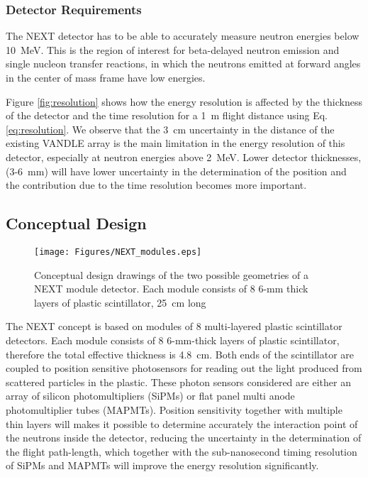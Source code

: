 \documentclass[preprint,3p,twocolumn]{elsarticle}
\begin{document}
\subsubsection{Detector Requirements}
The NEXT detector has to be able to accurately measure neutron energies below 10~MeV. This is the region of interest for beta-delayed neutron emission and single nucleon transfer reactions, in which the neutrons emitted at forward angles in the center of mass frame have low energies\cite{}.  

Figure \ref{fig:resolution} shows how the energy resolution is  affected by the thickness of the detector and the time resolution for a 1~m flight distance using Eq. \eqref{eq:resolution}. We observe that the 3~cm uncertainty in the distance of the existing VANDLE \cite{PETERS2016122} array is the main limitation in the energy resolution of this detector, especially at neutron energies above 2~MeV. Lower detector thicknesses, (3-6~mm) will have lower uncertainty in the determination of the position and  the contribution due to the time resolution becomes more important.


\subsection{Conceptual Design}

\begin{figure}[tp]
\centering
\texttt{[image: Figures/NEXT\_modules.eps]}
\caption{Conceptual design  drawings of the two possible geometries of a NEXT module detector. Each  module consists of 8 6-mm thick layers of plastic scintillator, 25~cm long}
\label{fig:NEXT_modules}
\end{figure}


The NEXT concept is based on modules of 8 multi-layered plastic scintillator detectors. Each  module consists of 8 6-mm-thick layers of plastic scintillator, therefore the total effective thickness is 4.8~cm. Both ends of the scintillator are coupled to position sensitive photosensors for reading out the light produced from scattered particles in the plastic. These photon sensors considered  are either an array of silicon photomultipliers (SiPMs) or flat panel multi anode photomultiplier tubes (MAPMTs). Position sensitivity together with multiple thin layers will makes it possible to determine  accurately the interaction point of the neutrons inside the detector, reducing the uncertainty in the determination of the flight path-length, which together with the sub-nanosecond timing resolution of SiPMs and MAPMTs will improve the energy resolution significantly.
\end{document}
